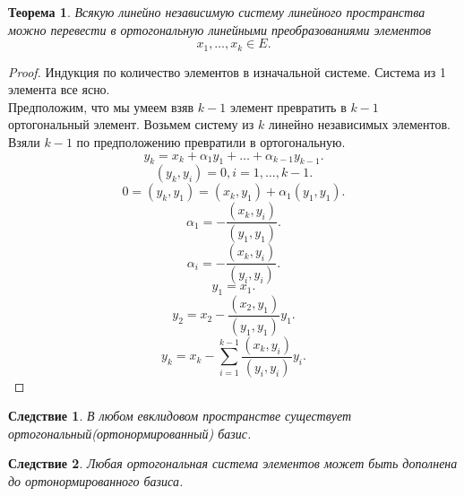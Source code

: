\documentclass{scrartcl}
\newtheorem{theorem}{Теорема}
\newtheorem{corollary}{Следствие}[theorem]
\begin{document}
\begin{theorem}
	Всякую линейно независимую систему линейного пространства можно перевести в ортогональную линейными преобразованиями элементов
	\[
		x_1, \dots, x_{k} \in E
		.\]
\end{theorem}
\begin{proof}
	Индукция по количество элементов в изначальной системе. Система из 1 элемента все ясно.\\
	Предположим, что мы умеем взяв $k - 1$ элемент превратить в  $k - 1$ ортогональный элемент. Возьмем систему из  $k$ линейно независимых элементов. Взяли  $k -1$ по предположению превратили в ортогональную. 
     \[
    y_{k} = x_{k} + \alpha_1 y_1 + \dots + \alpha_{k-1} y_{k - 1}
    .\] 
    \[
        (y_{k},y_{i}) = 0 , i = 1,\dots,k-1
    .\] 
    \[
        0 = (y_{k},y_1) = (x_{k},y_1) + \alpha_1(y_1,y_1)
    .\] 
    \[
    \alpha_{1} = - \frac{(x_{k},y_{i})}{(y_1,y_1)}
    .\] 
    \[
    \alpha_{i} = -\frac{(x_{k},y_{i})}{(y_{i},y_{i})}
    .\] 
    \[
    y_1 =x_1
    .\] 
    \[
    y_2 = x_2 - \frac{(x_2,y_1)}{(y_1,y_1)}y_1
    .\] 
    \[
    y_{k} = x_{k} - \sum_{i = 1}^{k - 1} \frac{(x_{k},y_{i})}{(y_{i},y_{i})} y_{i}
    .\] 
\end{proof}
\begin{corollary}
    В любом евклидовом пространстве существует ортогональный(ортонормированный) базис.
\end{corollary}
\begin{corollary}
    Любая ортогональная система элементов может быть дополнена до ортонормированного базиса.
\end{corollary}
\end{document}

